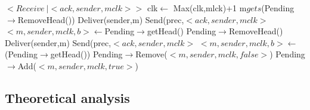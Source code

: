 \documentclass[a4paper]{article}
\begin{document}
\begin{algorithm}[H]
    \centering
    \begin{algorithmic}[5]

        \Event $<Receive\  | <ack,sender, mclk>>$
        \State clk$\gets$ Max(clk,mlck)+1
        \State m$gets$(Pending$\rightarrow$RemoveHead())
        \State Deliver(sender,m)
        \State Send(prec,$<ack,sender,mclk>$
        \EndIf
        \State $<m,sender,mclk,b>\gets$Pending$\rightarrow$getHead()
        \State Pending$\rightarrow$RemoveHead()
        \State Deliver(sender,m)
        \State Send(prec,$<ack,sender,mclk>$
        \EndIf
        \State $<m,sender,mclk,b>\gets$(Pending$\rightarrow$getHead())
        \EndWhile
        \Else
        \State Pending$\rightarrow$Remove($<m,sender,mclk,false>$)
        \State Pending$\rightarrow$Add($<m,sender,mclk,true>$)
        \EndIf
        \EndEvent
    \end{algorithmic}
\end{algorithm}


\subsection{Theoretical analysis}
\end{document}

